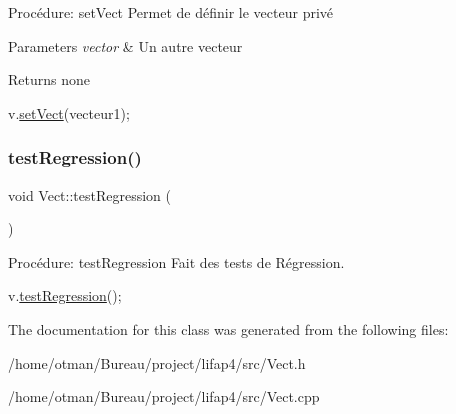 Procédure\+: set\+Vect Permet de définir le vecteur privé 


\begin{DoxyParams}{Parameters}
{\em vector} & Un autre vecteur \\
\hline
\end{DoxyParams}
\begin{DoxyReturn}{Returns}
none 
\begin{DoxyCode}
v.\hyperlink{classVect_a28408435bc900905d3416aef70140cd9}{setVect}(vecteur1);
\end{DoxyCode}
 
\end{DoxyReturn}
\mbox{\label{classVect_a734074001bba32f3d76e5cee612864f1}} 
\subsubsection{\texorpdfstring{test\+Regression()}{testRegression()}}
{\footnotesize\ttfamily void Vect\+::test\+Regression (\begin{DoxyParamCaption}{ }\end{DoxyParamCaption})}



Procédure\+: test\+Regression Fait des tests de Régression. 


\begin{DoxyCode}
v.\hyperlink{classVect_a734074001bba32f3d76e5cee612864f1}{testRegression}();
\end{DoxyCode}
 

The documentation for this class was generated from the following files\+:\begin{DoxyCompactItemize}
\item 
/home/otman/\+Bureau/project/lifap4/src/Vect.\+h\item 
/home/otman/\+Bureau/project/lifap4/src/Vect.\+cpp\end{DoxyCompactItemize}
